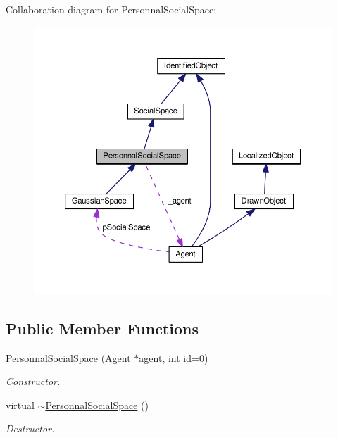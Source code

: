 Collaboration diagram for Personnal\+Social\+Space\+:\nopagebreak
\begin{figure}[H]
\begin{center}
\leavevmode
\includegraphics[width=350pt]{classPersonnalSocialSpace__coll__graph}
\end{center}
\end{figure}
\subsection*{Public Member Functions}
\begin{DoxyCompactItemize}
\item 
\hyperlink{classPersonnalSocialSpace_a7a1179eca56db918a2d7bd48b91fe23e}{Personnal\+Social\+Space} (\hyperlink{classAgent}{Agent} $\ast$agent, int \hyperlink{classIdentifiedObject_ad044a317a9b573a3d1bcd025df166eb5}{id}=0)
\begin{DoxyCompactList}\small\item\em Constructor. \end{DoxyCompactList}\item 
virtual \hyperlink{classPersonnalSocialSpace_aa4df470b07dddfcca155a47cf8dc8739}{$\sim$\+Personnal\+Social\+Space} ()
\begin{DoxyCompactList}\small\item\em Destructor. \end{DoxyCompactList}\end{DoxyCompactItemize}
